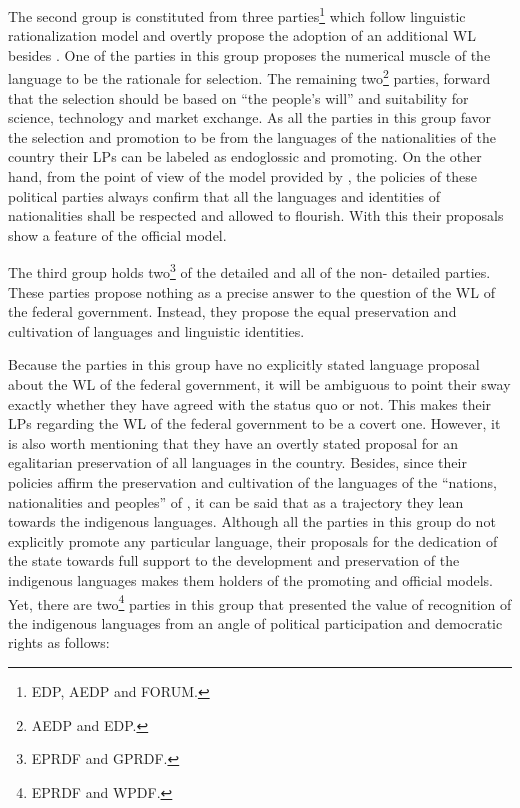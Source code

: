 \documentclass[output=paper,modfonts]{langscibook}
\begin{document}
The second group is constituted from three parties\footnote{EDP, AEDP and FORUM.} which follow linguistic rationalization model and overtly propose the adoption of an additional WL besides . One of the parties in this group proposes the numerical muscle of the language to be the rationale for selection. The remaining two\footnote{AEDP and EDP.} parties, forward that the selection should be based on “the people’s will” and suitability for science, technology and market exchange.  As all the parties in this group favor the selection and promotion to be from the languages of the nationalities of the country their LPs can be labeled as endoglossic and promoting. On the other hand, from the point of view of the model provided by \citet{Patten2001}, the policies of these political parties always confirm that all the languages and identities of nationalities shall be respected and allowed to flourish. With this their proposals show a  feature of the official  model. 

The third group holds two\footnote{EPRDF and GPRDF.} of the detailed and all of the non- detailed parties. These parties propose nothing as a precise answer to the question of the WL of the federal government. Instead, they propose the equal preservation and cultivation of languages and linguistic identities. 

Because the parties in this group have no explicitly stated language proposal about the WL of the federal government, it will be ambiguous to point their sway exactly whether they have agreed with the status quo or not. This makes their LPs regarding the WL of the federal government to be a covert one. However, it is also worth mentioning that they have an overtly stated proposal for an egalitarian preservation of all languages in the country. Besides, since their policies affirm the preservation and cultivation of the languages of the “nations, nationalities and peoples” of , it can be said that as a trajectory they lean towards the indigenous languages. Although all the parties in this group do not explicitly promote any particular language, their proposals for the dedication of the state towards full support to the development and preservation of the indigenous languages makes them holders of the promoting and official  models. Yet, there are two\footnote{EPRDF and WPDF.} parties in this group that presented the value of recognition of the indigenous languages from an angle of political participation and democratic rights as follows:
\end{document}
